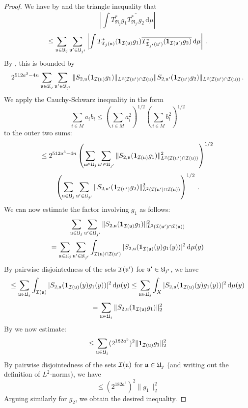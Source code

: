 \begin{proof}
    \leanok
    We have by  and the triangle inequality that
    $$
        \left| \int T_{\mathfrak{R}_j}^*g_1 \overline{T_{\mathfrak{R}_{j'}}^*g_2} \, \mathrm{d}\mu \right|
    $$
    $$
        \le \sum_{{\mathfrak u} \in {\mathfrak U}_j} \sum_{{\mathfrak u}' \in {\mathfrak U}_{j'}} \left| \int T^*_{{\mathfrak T}_j({\mathfrak u})} (\mathbf{1}_{{\mathcal{I}}({\mathfrak u})} g_1) \overline{T^*_{{\mathfrak T}_{j'}({\mathfrak u}')} (\mathbf{1}_{{\mathcal{I}}({\mathfrak u}')} g_2)} \, \mathrm{d}\mu \right|\,.
    $$
    By , this is bounded by
    \begin{equation}
        \label{eq-S2uu'}
         2^{512a^3-4n} \sum_{{\mathfrak u} \in {\mathfrak U}_j} \sum_{{\mathfrak u}' \in {\mathfrak U}_{j'}} \|S_{2,{\mathfrak u}} (\mathbf{1}_{{\mathcal{I}}({\mathfrak u})}g_1)\|_{L^2({\mathcal{I}}({\mathfrak u}')\cap {\mathcal{I}}({\mathfrak u})} \|S_{2, {\mathfrak u}'} (\mathbf{1}_{{\mathcal{I}}({\mathfrak u}')}g_2)\|_{L^2({\mathcal{I}}({\mathfrak u}')\cap{\mathcal{I}}({\mathfrak u}))}\,.
    \end{equation}
    We apply the Cauchy-Schwarz inequality in the form
    \begin{equation*}
        \sum_{i \in M} a_i b_i \le (\sum_{i \in M} a_i^2 )^{1/2}(\sum_{i \in M} b_i^2 )^{1/2}
    \end{equation*} to the outer two sums:
    $$
        \le 2^{512a^3-4n} \left(\sum_{{\mathfrak u} \in {\mathfrak U}_j} \sum_{{\mathfrak u}' \in {\mathfrak U}_{j'}} \|S_{2,{\mathfrak u}} (\mathbf{1}_{{\mathcal{I}}({\mathfrak u})}g_1)\|_{L^2({\mathcal{I}}({\mathfrak u}')\cap {\mathcal{I}}({\mathfrak u}))}^2 \right)^{1/2}
    $$
    $$
        \left(\sum_{{\mathfrak u} \in {\mathfrak U}_j} \sum_{{\mathfrak u}' \in {\mathfrak U}_{j'}} \|S_{2,{\mathfrak u}'} (\mathbf{1}_{{\mathcal{I}}({\mathfrak u}')}g_2)\|_{L^2({\mathcal{I}}({\mathfrak u}')\cap{\mathcal{I}}({\mathfrak u}))}^2 \right)^{1/2}\,.
    $$
    We can now estimate the factor involving $g_1$ as follows:
    \begin{multline*}
        \sum_{{\mathfrak u} \in {\mathfrak U}_j}\sum_{{\mathfrak u}' \in {\mathfrak U}_{j'}} \|S_{2,{\mathfrak u}} (\mathbf{1}_{{\mathcal{I}}({\mathfrak u})}g_1)\|_{L^2({\mathcal{I}}({\mathfrak u}')\cap {\mathcal{I}}({\mathfrak u}))}^2
        \\ = \sum_{{\mathfrak u} \in {\mathfrak U}_j}\sum_{{\mathfrak u}' \in {\mathfrak U}_{j'}} \int_{{\mathcal{I}}({\mathfrak u}) \cap {\mathcal{I}}({\mathfrak u}')} |S_{2,{\mathfrak u}} (\mathbf{1}_{{\mathcal{I}}({\mathfrak u})}(y)g_1(y))|^2 \, \mathrm{d}\mu(y)
    \end{multline*}
    By pairwise disjointedness of the sets ${\mathcal{I}}({\mathfrak u}')$ for ${\mathfrak u}' \in {\mathfrak U}_{j'}$, we have
    $$
        \le \sum_{{\mathfrak u} \in {\mathfrak U}_j}\int_{{\mathcal{I}}({\mathfrak u})} |S_{2,{\mathfrak u}} (\mathbf{1}_{{\mathcal{I}}({\mathfrak u})}(y)g_1(y))|^2 \, \mathrm{d}\mu(y)
        \le \sum_{{\mathfrak u} \in {\mathfrak U}_j}\int_{X} |S_{2,{\mathfrak u}} (\mathbf{1}_{{\mathcal{I}}({\mathfrak u})}(y)g_1(y))|^2 \, \mathrm{d}\mu(y)
    $$
    $$
       = \sum_{{\mathfrak u} \in {\mathfrak U}_j}\|S_{2,{\mathfrak u}} (\mathbf{1}_{{\mathcal{I}}({\mathfrak u})}g_1)\|_2^2
    $$
    By  we now estimate:
    $$
        \le \sum_{{\mathfrak u} \in {\mathfrak U}_j}(2^{182a^3})^2 \|\mathbf{1}_{{\mathcal{I}}({\mathfrak u})}g_1\|_2^2
    $$
    By pairwise disjointedness of the sets ${\mathcal{I}}({\mathfrak u})$ for ${\mathfrak u} \in {\mathfrak U}_j$ (and writing out the definition of $L^2$-norms), we have
    $$
        \le (2^{182a^3})^2 \|g_1\|_2^2
    $$
    Arguing similarly for $g_2$, we obtain the desired inequality.
\end{proof}

